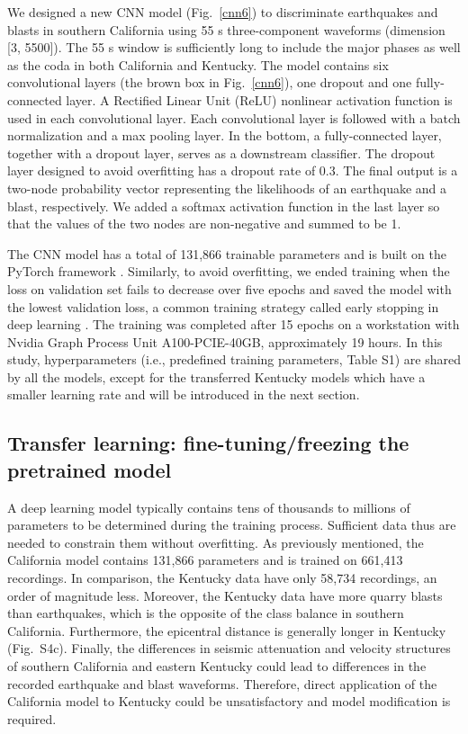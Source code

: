 \documentclass{gji}
\begin{document}
We designed a new CNN model (Fig.~\ref{cnn6}) to discriminate earthquakes and blasts in southern California using 55 s three-component waveforms (dimension [3, 5500]). The 55 s window is sufficiently long to include the major phases as well as the coda in both California and Kentucky. The model contains six convolutional layers (the brown box in Fig.~\ref{cnn6}), one dropout and one fully-connected layer. A Rectified Linear Unit (ReLU) nonlinear activation function is used in each convolutional layer. Each convolutional layer is followed with a batch normalization and a max pooling layer. In the bottom, a fully-connected layer, together with a dropout layer, serves as a downstream classifier. The dropout layer designed to avoid overfitting \citep{dropout} has a dropout rate of 0.3. The final output is a two-node probability vector representing the likelihoods of an earthquake and a blast, respectively. We added a softmax activation function in the last layer so that the values of the two nodes are non-negative and summed to be 1.

The CNN model has a total of 131,866 trainable parameters and is built on the PyTorch framework \citep{torch}. Similarly, to avoid overfitting, we ended training when the loss on validation set fails to decrease over five epochs and saved the model with the lowest validation loss, a common training strategy called early stopping in deep learning \citep{early_stop}. The training was completed after 15 epochs on a workstation with Nvidia Graph Process Unit A100-PCIE-40GB, approximately 19 hours. In this study, hyperparameters (i.e., predefined training parameters, Table S1) are shared by all the models, except for the transferred Kentucky models which have a smaller learning rate and will be introduced in the next section.

\subsection{Transfer learning: fine-tuning/freezing the pretrained model}
\label{transfer_learning_strategy}
A deep learning model typically contains tens of thousands to millions of parameters to be determined during the training process. Sufficient data thus are needed to constrain them without overfitting. As previously mentioned, the California model contains 131,866 parameters and is trained on 661,413 recordings. In comparison, the Kentucky data have only 58,734 recordings, an order of magnitude less. Moreover, the Kentucky data have more quarry blasts than earthquakes, which is the opposite of the class balance in southern California. Furthermore, the epicentral distance is generally longer in Kentucky (Fig.~S4c). Finally, the differences in seismic attenuation \citep{attenu_ek,attenu_socal} and velocity structures of southern California and eastern Kentucky could lead to differences in the recorded earthquake and blast waveforms. Therefore, direct application of the California model to Kentucky could be unsatisfactory and model modification is required.
\end{document}
